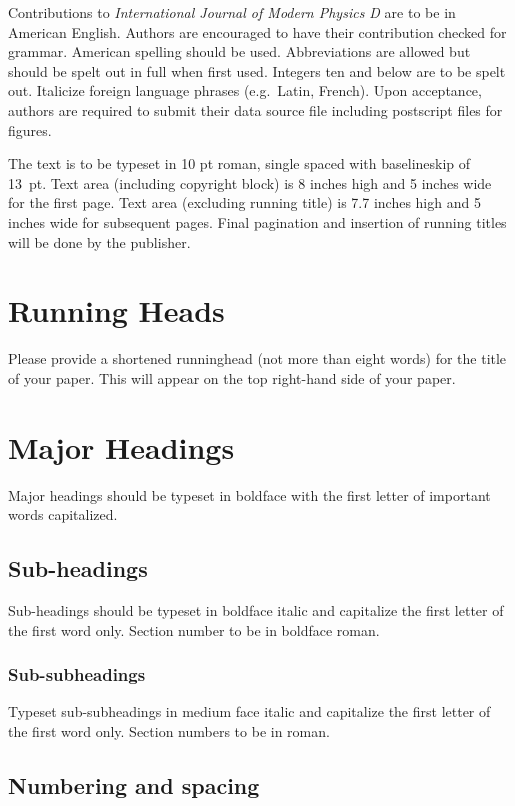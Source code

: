 \documentclass{ws-ijmpd}
\begin{document}
Contributions to {\it International Journal of Modern Physics D}
are to be in American English. Authors are encouraged to have their
contribution checked for grammar. American spelling should be
used. Abbreviations are allowed but should be spelt out in full when
first used. Integers ten and below are to be spelt out.  Italicize
foreign language phrases (e.g.~Latin, French).  Upon acceptance,
authors are required to submit their data source file including
postscript files for figures.

The text is to be typeset in 10 pt roman, single spaced with
baselineskip of 13~pt. Text area (including copyright block)
is 8 inches high and 5 inches wide for the first page.  Text area
(excluding running title) is 7.7 inches high and 5 inches wide for
subsequent pages.  Final pagination and insertion of running titles
will be done by the publisher.

\section{Running Heads}

Please provide a shortened runninghead (not more than eight words) for
the title of your paper. This will appear on the top right-hand side
of your paper.

\section{Major Headings}

Major headings should be typeset in boldface with the first
letter of important words capitalized.

\subsection{Sub-headings}

Sub-headings should be typeset in boldface italic and capitalize
the first letter of the first word only. Section number to be in
boldface roman.

\subsubsection{Sub-subheadings}

Typeset sub-subheadings in medium face italic and capitalize the
first letter of the first word only. Section numbers to be in
roman.

\subsection{Numbering and spacing}
\end{document}
